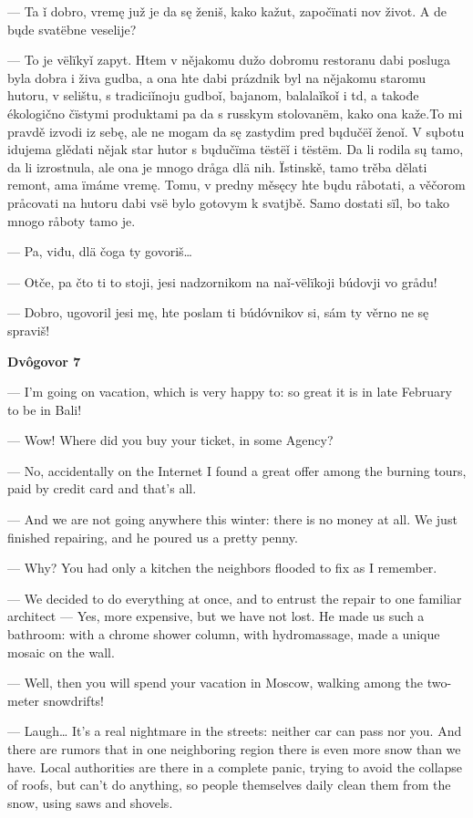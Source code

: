 — Ta ǐ dobro, vremę juž je da sę ženiš, kako kažut, započïnati nov život. A de bųde svatëbne veselije?

— To je vëlïkyǐ zapyt. Htem v nějakomu dužo dobromu restoranu dabi posluga byla dobra i živa gudba, a ona hte dabi prázdnik byl na nějakomu staromu hutoru, v selištu, s tradiciǐnoju gudboǐ, bajanom, balalaǐkoǐ i td, a takođe ékologično čïstymi produktami pa da s russkym stolovanëm, kako ona kaže.To mi pravdě izvodi iz sebę, ale ne mogam da sę zastydim pred bųdučëǐ ženoǐ. V sųbotu idujema glědati nějak star hutor s bųdučïma tëstëǐ i tëstëm. Da li rodila sų tamo, da li izrostnula, ale ona je mnogo dråga dlä nih. Ïstinskě, tamo trěba dělati remont, ama ïmáme vremę. Tomu, v predny měsęcy hte bųdu råbotati, a věčorom pråcovati na hutoru dabi vsë bylo gotovym k svatjbě. Samo dostati sïl, bo tako mnogo råboty tamo je.

— Pa, viđu, dlä čoga ty govoriš…

— Otče, pa čto ti to stoji, jesi nadzornikom na naǐ-vëlïkoji búdovji vo grådu!

— Dobro, ugovoril jesi mę, hte poslam ti búdóvnikov si, sám ty věrno ne sę spraviš!


\textbf{Dvôgovor 7}


— I’m going on vacation, which is very happy to: so great it is in late February to be in Bali!

— Wow! Where did you buy your ticket, in some Agency?

— No, accidentally on the Internet I found a great offer among the burning tours, paid by credit card and that’s all.

— And we are not going anywhere this winter: there is no money at all. We just finished repairing, and he poured us a pretty penny.

— Why? You had only a kitchen the neighbors flooded to fix as I remember.

— We decided to do everything at once, and to entrust the repair to one familiar architect — Yes, more expensive, but we have not lost. He made us such a bathroom: with a chrome shower column, with hydromassage, made a unique mosaic on the wall.

— Well, then you will spend your vacation in Moscow, walking among the two-meter snowdrifts!

— Laugh… It’s a real nightmare in the streets: neither car can pass nor you. And there are rumors that in one neighboring region there is even more snow than we have. Local authorities are there in a complete panic, trying to avoid the collapse of roofs, but can’t do anything, so people themselves daily clean them from the snow, using saws and shovels.

